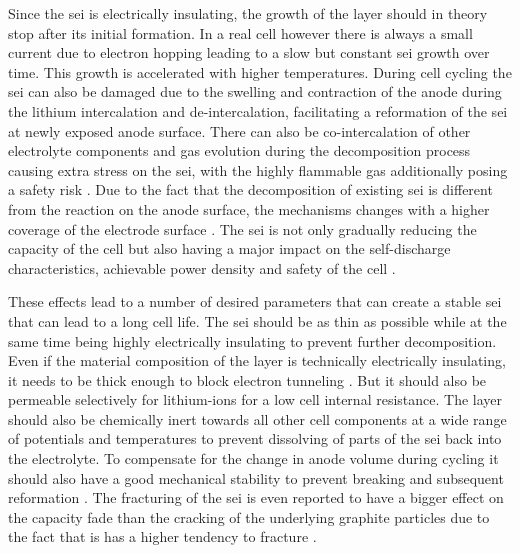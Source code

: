 Since the \gls{sei} is electrically insulating, the growth of the layer should in theory stop after its initial formation. In a real cell however there is always a small current due to electron hopping leading to a slow but constant \gls{sei} growth over time. This growth is accelerated with higher temperatures. During cell cycling the \gls{sei} can also be damaged due to the swelling and contraction of the anode during the lithium intercalation and de-intercalation, facilitating a reformation of the \gls{sei} at newly exposed anode surface. There can also be co-intercalation of other electrolyte components and gas evolution during the decomposition process causing extra stress on the \gls{sei}, with the highly flammable gas additionally posing a safety risk \cite{Seidl.2016,Balagopal.2018}. Due to the fact that the decomposition of existing \gls{sei} is different from the reaction on the anode surface, the mechanisms changes with a higher coverage of the electrode surface \cite{Wang.2018}. The \gls{sei} is not only gradually reducing the capacity of the cell but also having a major impact on the self-discharge characteristics, achievable power density and safety of the cell \cite{An.2016}. \par
These effects lead to a number of desired parameters that can create a stable \gls{sei} that can lead to a long cell life. The \gls{sei} should be as thin as possible while at the same time being highly electrically insulating to prevent further decomposition. Even if the material composition of the layer is technically electrically insulating, it needs to be thick enough to block electron tunneling \cite{Lin.2016}. But it should also be permeable selectively for lithium-ions for a low cell internal resistance. The layer should also be chemically inert towards all other cell components at a wide range of potentials and temperatures to prevent dissolving of parts of the \gls{sei} back into the electrolyte. To compensate for the change in anode volume during cycling it should also have a good mechanical stability to prevent breaking and subsequent reformation \cite{An.2016, Wang.2018}. The fracturing of the \gls{sei} is even reported to have a bigger effect on the capacity fade than the cracking of the underlying graphite particles due to the fact that is has a higher tendency to fracture \cite{Deshpandezand.2017}. \par
